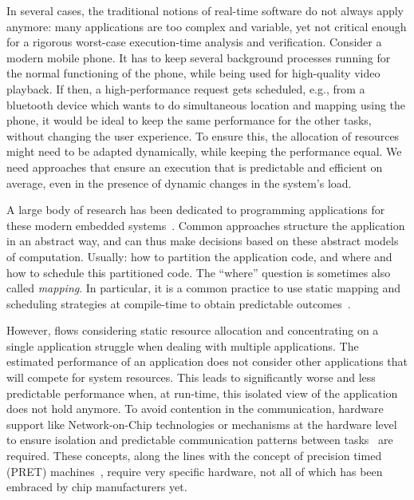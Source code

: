 \documentclass[sigplan,10pt]{acmart}
\begin{document}
In several cases, the traditional notions of real-time software do not always apply anymore: many applications are too complex and variable, yet not critical enough for a rigorous worst-case execution-time analysis and verification.
Consider a modern mobile phone. It has to keep several background processes running for the normal functioning of the phone, while being used for high-quality video playback. If then, a high-performance request 
gets scheduled, e.g., from a bluetooth device which wants to do simultaneous location and mapping using the phone, it would be ideal to keep the same performance for the other tasks, without changing the user experience.
To ensure this, the allocation of resources might need to be adapted dynamically, while keeping the performance equal.
We need approaches that ensure an execution that is predictable and efficient on average, even in the presence of dynamic changes in the system's load.

A large body of research has been dedicated to programming applications for these modern embedded systems~\cite{eker2003taming,thiele2007mapping,maps08,pimentel2006systematic,nikolov2008daedalus}. Common approaches structure the application in an abstract way, and can thus make
decisions based on these abstract models of computation. Usually: how to partition the application code, and where and how to schedule this partitioned code. The ``where'' question is sometimes also called \emph{mapping}.
In particular, it is a common practice to use static mapping and scheduling strategies at compile-time to obtain predictable outcomes~\cite{bekooij2004predictable}.

However, flows considering static resource allocation and concentrating on a single application struggle when dealing with multiple applications.
The estimated performance of an application does not consider other applications that will compete for system resources.
This leads to significantly worse and less predictable performance when, at run-time, this isolated view of the application does not hold anymore.
To avoid contention in the communication, hardware support like Network-on-Chip technologies  
or mechanisms at the hardware level to ensure isolation and predictable communication patterns between tasks~\cite{hansson2009compsoc,kumar2008analyzing} are required. 
These concepts, along the lines with the concept of precision timed (PRET) machines~\cite{edwards2007case}, require very specific hardware, not all of which has been embraced by chip manufacturers yet.
\end{document}

